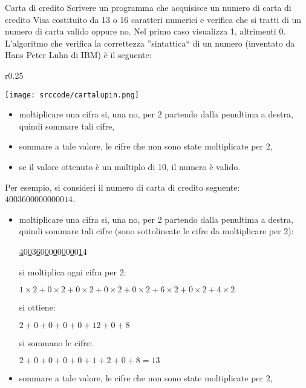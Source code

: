 \begin{exrev}{Carta di credito}
Scrivere un programma che acquisisce un numero di carta di credito Visa costituito da 13 o 16 caratteri numerici e verifica che si tratti di un numero di carta valido oppure no. Nel primo caso visualizza 1, altrimenti 0. L'algoritmo che verifica la correttezza ''sintattica`` di un numero (inventato da Hans Peter Luhn di IBM) \`e il seguente: 
\begin{wrapfigure}{r}{0.25\textwidth}
  \begin{center}%
    \texttt{[image: srccode/cartalupin.png]}
  \end{center}\vspace{-4em}
\end{wrapfigure}

\begin{itemize}
\item moltiplicare una cifra si, una no, per 2 partendo dalla penultima a destra, quindi sommare tali cifre,
\item sommare a tale valore, le cifre che non sono state moltiplicate per 2,
\item se il valore ottenuto \`e un multiplo di 10, il numero \`e valido.
\end{itemize}



Per esempio, si consideri il numero di carta di credito seguente: $4003600000000014$.
\begin{itemize}
\item moltiplicare una cifra si, una no, per 2 partendo dalla penultima a destra, quindi sommare tali cifre (sono sottolineate le cifre da moltiplicare per 2):

\underline{4}0\underline{0}3\underline{6}0\underline{0}0\underline{0}0\underline{0}0\underline{0}0\underline{1}4

si moltiplica ogni cifra per 2:

$1\times2 + 0\times2 + 0\times2 + 0\times2 + 0\times2 + 6\times2 + 0\times2 + 4\times2$

si ottiene:

$2 + 0 + 0 + 0 + 0 + 12 + 0 + 8$

si sommano le cifre:

$2 + 0 + 0 + 0 + 0 + 1 + 2 + 0 + 8 = 13$

\item sommare a tale valore, le cifre che non sono state moltiplicate per 2,


\end{itemize}
\end{exrev}
